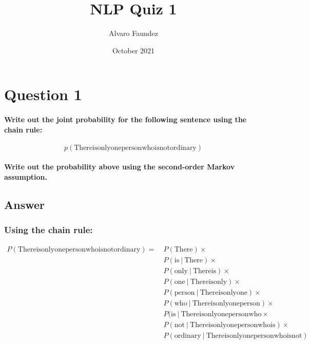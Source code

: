 \documentclass{article}
\title{NLP Quiz 1}
\author{Alvaro Faundez}
\date{October 2021}
\newcommand\given[1][]{\:#1\vert\:}
\begin{document}
\maketitle

\section*{Question 1}

\paragraph{Write out the joint probability for the following sentence using the chain rule:}

\begin{equation*}
    p(\text{There}
\text{is}
\text{only}
\text{one}
\text{person}
\text{who}
\text{is}
\text{not}
\text{ordinary})
\end{equation*}

\paragraph{Write out the probability above using the second-order Markov assumption.}

\subsection*{Answer}

\subsubsection*{Using the chain rule:}

\begin{equation*}
    \begin{split}
    P(\text{There}
\text{is}
\text{only}
\text{one}
\text{person}
\text{who}
\text{is}
\text{not}
\text{ordinary}) =\ & P(\text{There}) \times \\
    & P(\text{is} \given \text{There}) \times \\
    & P(\text{only} \given \text{There}
\text{is} ) \times \\
    & P(\text{one} \given \text{There}
\text{is}
\text{only}) \times \\
    & P(\text{person} \given \text{There}
\text{is}
\text{only}
\text{one}) \times \\
    & P(\text{who} \given \text{There}
\text{is}
\text{only}
\text{one}
\text{person}) \times \\
    & P(\text{is} \given \text{There}
\text{is}
\text{only}
\text{one}
\text{person}
\text{who} \times \\
    & P(\text{not}
\given \text{There}
\text{is}
\text{only}
\text{one}
\text{person}
\text{who}
\text{is}) \times \\
    & P(\text{ordinary} \given \text{There}
\text{is}
\text{only}
\text{one}
\text{person}
\text{who}
\text{is}
\text{not})
    \end{split}
\end{equation*}
\end{document}
